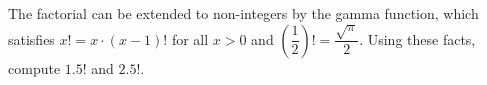 The factorial can be extended to non-integers by the gamma function, which satisfies $x!=x\cdot(x-1)!$ for all $x>0$ and $\left(\dfrac{1}{2}\right)!=\dfrac{\sqrt\pi}{2}$. Using these facts, compute $1.5!$ and $2.5!$.
